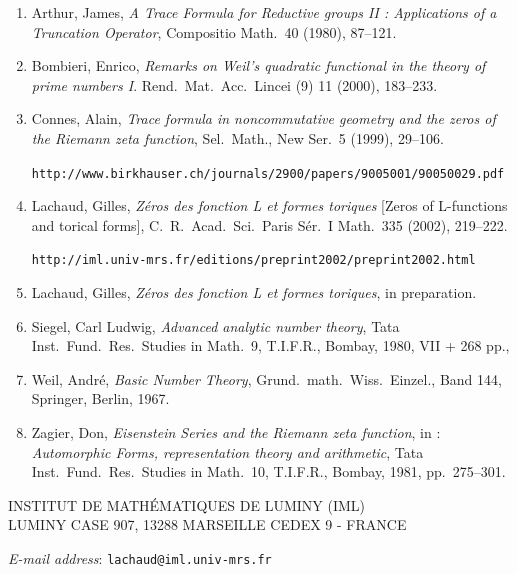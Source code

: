 \documentclass[12pt]{article}
\begin{document}
\begin{enumerate}
\item Arthur, James, \emph{A Trace Formula for Reductive groups II : Applications of a Truncation Operator}, Compositio Math.\ 40 (1980), 87--121.
\item Bombieri, Enrico, \emph{Remarks on Weil's quadratic functional in the theory of prime numbers I}. Rend.\ Mat.\ Acc.\ Lincei (9) 11 (2000), 183--233.
\item Connes, Alain, \emph{Trace formula in noncommutative geometry and the zeros of the Riemann zeta function}, Sel.\ Math., New Ser.\ 5 (1999), 29--106.

\texttt{http://www.birkhauser.ch/journals/2900/papers/9005001/90050029.pdf}

\item Lachaud, Gilles, \emph{Zéros des fonction L et formes toriques} [Zeros of L-functions and torical forms], C.\ R.\ Acad.\ Sci.\ Paris Sér.\ I Math.\ 335 (2002), 219--222.

\texttt{http://iml.univ-mrs.fr/editions/preprint2002/preprint2002.html}

\item Lachaud, Gilles, \emph{Zéros des fonction L et formes toriques}, in preparation.
\item Siegel, Carl Ludwig, \emph{Advanced analytic number theory}, Tata Inst.\ Fund.\ Res.\ Studies in Math.\ 9, T.I.F.R., Bombay, 1980, VII + 268 pp.,
\item Weil, André, \emph{Basic Number Theory}, Grund.\ math.\ Wiss.\ Einzel., Band 144, Springer, Berlin, 1967.
\item Zagier, Don, \emph{Eisenstein Series and the Riemann zeta function}, in : \emph{Automorphic Forms, representation theory and arithmetic}, Tata Inst.\ Fund.\ Res.\ Studies in Math.\ 10, T.I.F.R., Bombay, 1981, pp.\ 275--301.
\end{enumerate}

\vfill

\noindent
INSTITUT DE MATHÉMATIQUES DE LUMINY (IML)\\
LUMINY CASE 907, 13288 MARSEILLE CEDEX 9 - FRANCE

\medskip

\noindent
\emph{E-mail address}: \texttt{lachaud@iml.univ-mrs.fr}
\end{document}
